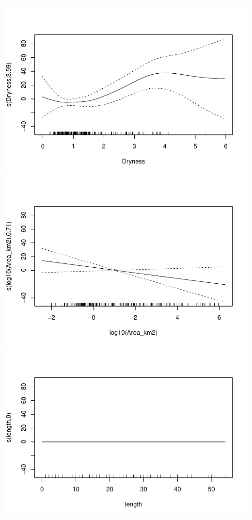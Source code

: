 \documentclass[]{elsarticle} %
\begin{document}
\includegraphics{Forest_and_Water_files/figure-latex/model7_noLatb-1.pdf}
\includegraphics{Forest_and_Water_files/figure-latex/model7_noLatb-2.pdf}
\includegraphics{Forest_and_Water_files/figure-latex/model7_noLatb-3.pdf}
\end{document}
